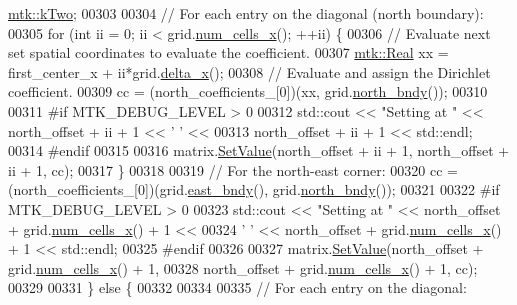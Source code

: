 \begin{DoxyCode}
      \hyperlink{group__c01-roots_gaf39c2d851a2db744f4feb1c5ab3ec2cf}{mtk::kTwo};
00303 
00304     \textcolor{comment}{// For each entry on the diagonal (north boundary):}
00305     \textcolor{keywordflow}{for} (\textcolor{keywordtype}{int} ii = 0; ii < grid.\hyperlink{classmtk_1_1UniStgGrid2D_a2d182866a398aba8e4829590e85bf939}{num\_cells\_x}(); ++ii) \{
00306       \textcolor{comment}{// Evaluate next set spatial coordinates to evaluate the coefficient.}
00307       \hyperlink{group__c01-roots_gac080bbbf5cbb5502c9f00405f894857d}{mtk::Real} xx = first\_center\_x + ii*grid.\hyperlink{classmtk_1_1UniStgGrid2D_aca4710004c4a7da6a9e8fd6ab32a691f}{delta\_x}();
00308       \textcolor{comment}{// Evaluate and assign the Dirichlet coefficient.}
00309       cc = (north\_coefficients\_[0])(xx, grid.\hyperlink{classmtk_1_1UniStgGrid2D_afe1ead253cdeb5503e0489eba8fd84e2}{north\_bndy}());
00310 
00311 \textcolor{preprocessor}{      #if MTK\_DEBUG\_LEVEL > 0}
00312       std::cout << \textcolor{stringliteral}{"Setting at "} << north\_offset + ii + 1 << \textcolor{charliteral}{' '} <<
00313         north\_offset + ii + 1 << std::endl;
00314 \textcolor{preprocessor}{      #endif}
00315 
00316       matrix.\hyperlink{classmtk_1_1DenseMatrix_a784ce5784109ac86bfb9d8562b334b13}{SetValue}(north\_offset + ii + 1, north\_offset + ii + 1, cc);
00317     \}
00318 
00319     \textcolor{comment}{// For the north-east corner:}
00320     cc = (north\_coefficients\_[0])(grid.\hyperlink{classmtk_1_1UniStgGrid2D_a03f689eb29a6369b82ce1207c655d5ff}{east\_bndy}(), grid.\hyperlink{classmtk_1_1UniStgGrid2D_afe1ead253cdeb5503e0489eba8fd84e2}{north\_bndy}());
00321 
00322 \textcolor{preprocessor}{    #if MTK\_DEBUG\_LEVEL > 0}
00323     std::cout << \textcolor{stringliteral}{"Setting at "} << north\_offset + grid.\hyperlink{classmtk_1_1UniStgGrid2D_a2d182866a398aba8e4829590e85bf939}{num\_cells\_x}() + 1 <<
00324       \textcolor{charliteral}{' '} << north\_offset + grid.\hyperlink{classmtk_1_1UniStgGrid2D_a2d182866a398aba8e4829590e85bf939}{num\_cells\_x}() + 1 << std::endl;
00325 \textcolor{preprocessor}{    #endif}
00326 
00327     matrix.\hyperlink{classmtk_1_1DenseMatrix_a784ce5784109ac86bfb9d8562b334b13}{SetValue}(north\_offset + grid.\hyperlink{classmtk_1_1UniStgGrid2D_a2d182866a398aba8e4829590e85bf939}{num\_cells\_x}() + 1,
00328                     north\_offset + grid.\hyperlink{classmtk_1_1UniStgGrid2D_a2d182866a398aba8e4829590e85bf939}{num\_cells\_x}() + 1, cc);
00329 
00331   \} \textcolor{keywordflow}{else} \{
00332 
00334 
00335     \textcolor{comment}{// For each entry on the diagonal:}

\end{DoxyCode}
